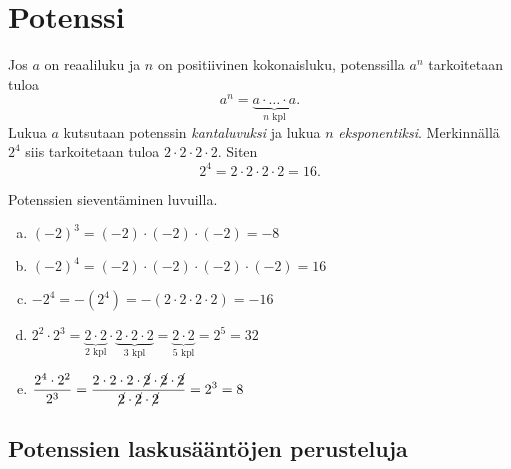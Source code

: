 \chapter{Potenssi}
    
    Jos $a$ on reaaliluku ja $n$ on positiivinen kokonaisluku, potenssilla $a^n$ tarkoitetaan tuloa
    \[
        a^n = \underbrace{a\cdot \ldots \cdot a}_{n\text{ kpl}}. 
    \]
Lukua $a$ kutsutaan potenssin \emph{kantaluvuksi} ja lukua $n$ \emph{eksponentiksi}. Merkinnällä $2^4$ siis tarkoitetaan tuloa $2\cdot 2\cdot 2\cdot 2$. Siten
        \[
            2^4=2\cdot 2\cdot 2\cdot 2=16.
        \]
            
    \begin{esimerkki}
        Potenssien sieventäminen luvuilla.
        \begin{enumerate}[a)]
            \item $(-2)^3 = (-2)\cdot (-2)\cdot (-2) = -8$
            \item $(-2)^4 = (-2)\cdot (-2)\cdot (-2)\cdot (-2) = 16$
            \item $-2^4   = -(2^4) = -(2\cdot 2\cdot 2\cdot 2) = -16$
            \item $2^2\cdot 2^3 =
                \underbrace{2\cdot 2}_{\text{$2$ kpl}}\cdot \underbrace{2\cdot
                2\cdot 2}_{\text{$3$ kpl}} = \underbrace{2\cdot 2}_{\text{$5$ kpl}}=2^5 = 32$
            \item $\displaystyle\frac{2^4\cdot 2^2}{2^3} =
                \frac{2\cdot 2\cdot 2\cdot \cancel{2} \cdot \cancel{2}\cdot
                \cancel{2}}{\cancel{2}\cdot \cancel{2}\cdot \cancel{2}} = 2^3 = 8$
        \end{enumerate}
    \end{esimerkki}
    
\section*{Potenssien laskusääntöjen perusteluja}
    
